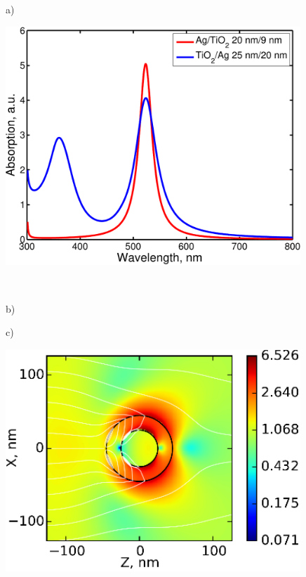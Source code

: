 \documentclass[aip,jap,reprint]{revtex4-1}
\begin{document}
\begin{figure}[!h]
  \begin{minipage}[h]{0.47\textwidth}
    \begin{flushleft}
      a)
    \end{flushleft}
  \end{minipage}
  \begin{minipage}[h]{0.47\textwidth}
    \includegraphics[width=0.99\textwidth]{reverse}
  \end{minipage}\\
  \vspace{4pt}
  \begin{minipage}[h]{0.235\textwidth}
    \begin{flushleft}
      b)
    \end{flushleft}
  \end{minipage}
  \hfill
  \begin{minipage}[h]{0.235\textwidth}
    \begin{flushleft}
      c)
    \end{flushleft}
  \end{minipage}
  \begin{minipage}[h]{0.235\textwidth}
    \includegraphics[width=0.99\textwidth]{3b}

\end{minipage}
\end{figure}
\end{document}
